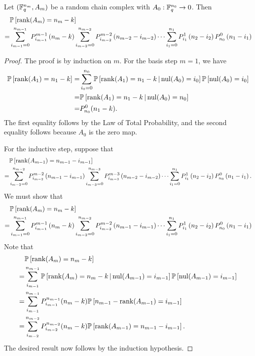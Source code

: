 \begin{lemma}\label{lemProbranks}
Let $(\mathbb{F}_q^{n_m}, A_m)$ be a random chain complex with $A_0:\mathbb{F}_q^{n_0}\to 0$.  Then
\begin{align*}
 &  \mathbb{P}\left[\operatorname{\mathrm{rank}}(A_{m}) = n_{m} - k\right]\\
=& 	\sum_{i_{m-1}=0}^{n_{m-1}} P_{i_{m-1}}^{m-1}\left(n_{m} -k\right)
	\sum_{i_{m-2}=0}^{n_{m-2}} P_{i_{m-2}}^{m-2}\left(n_{m-2} - i_{m-2}\right)
		\cdots
	\sum_{i_1 = 0}^{n_1} P_{i_1}^1\left(n_2 - i_2\right) P_{n_0}^0 \left(n_1 - i_1\right) 
\end{align*}
\end{lemma}
\begin{proof}
The proof is by induction on $m$. For the basis step $m=1$, we have
\begin{align*}
\mathbb{P}\left[\operatorname{\mathrm{rank}}(A_1) = n_1 - k\right]
	=& \sum_{i_0=0}^{n_0}\mathbb{P}\left [\operatorname{\mathrm{rank}}(A_1)= n_1 - k\,|\,\mathrm{nul} (A_0) = i_0\right]
		\mathbb{P}\left[\mathrm{nul}(A_0) = i_0 \right]\\
	=& \mathbb{P}\left [\operatorname{\mathrm{rank}}(A_1)= n_1 - k\,|\,\mathrm{nul} (A_0) = n_0\right]\\
	=& P_{n_0}^0(n_1 - k).
\end{align*}
The first equality follows by the Law of Total Probability, and the second equality follows because $A_0$ is the zero map.

For the inductive step, suppose that
\begin{align*}
 &  \mathbb{P}\left[\operatorname{\mathrm{rank}}(A_{m-1}) = n_{m-1} - i_{m-1}\right]\\
=& 	\sum_{i_{m-2}=0}^{n_{m-2}} P_{i_{m-2}}^{m-2}\left(n_{m-1} -i_{m-1}\right)
	\sum_{i_{m-3}=0}^{n_{m-3}} P_{i_{m-3}}^{m-3}\left(n_{m-2} - i_{m-2}\right)
		\cdots
	\sum_{i_1 = 0}^{n_1} P_{i_1}^1\left(n_2 - i_2\right) P_{n_0}^0 \left(n_1 - i_1\right).
\end{align*}
We must show that
\begin{align*}
 &  \mathbb{P}\left[\operatorname{\mathrm{rank}}(A_{m}) = n_{m} - k\right]\\
=& 	\sum_{i_{m-1}=0}^{n_{m-1}} P_{i_{m-1}}^{m-1}\left(n_{m} -k\right)
	\sum_{i_{m-2}=0}^{n_{m-2}} P_{i_{m-2}}^{m-2}\left(n_{m-1} - i_{m-1}\right)
		\cdots
	\sum_{i_1 = 0}^{n_1} P_{i_1}^1\left(n_2 - i_2\right) P_{n_0}^0 \left(n_1 - i_1\right) 
\end{align*}
Note that
\begin{align*}
 &	\mathbb{P}\left[\operatorname{\mathrm{rank}}(A_{m}) = n_{m} - k\right]\\
=& 	\sum_{i_{m-1}}^{n_{m-1}} \mathbb{P}\left[ \operatorname{\mathrm{rank}}(A_{m}) = n_{m} - k  
\,|\, \mathrm{nul}(A_{m-1}) = i_{m-1}\right] \mathbb{P}\left[\mathrm{nul}(A_{m-1}) = i_{m-1}\right]\\
=&  \sum_{i_{m-1}}^{n_{m-1}} P_{i_{m-1}}^{n_{m-1}}(n_{m} - k)
		\mathbb{P}\left[n_{m-1} - \operatorname{\mathrm{rank}}(A_{m-1}) = i_{m-1}\right]\\
=&	\sum_{i_{m-2}}^{n_{m-2}} P_{i_{m-2}}^{n_{m-2}}(n_{m} - k)
		\mathbb{P}\left[\operatorname{\mathrm{rank}}(A_{m-1}) = n_{m-1}- i_{m-1}\right].
\end{align*}
The desired result now follows by the induction hypothesis.
\end{proof}


